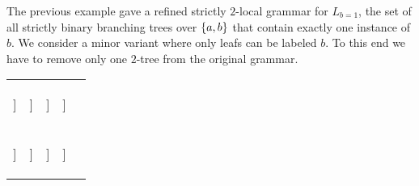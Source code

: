 \begin{examplebox}
    The previous example gave a refined strictly $2$-local grammar for $L_{b=1}$, the set of all strictly binary branching trees over $\left \{ a,b \right \}$ that contain exactly one instance of $b$.
    We consider a minor variant where only leafs can be labeled $b$.
    To this end we have to remove only one $2$-tree from the original grammar.
    \begin{center}
        \begin{tabular}{ccccc}
            \begin{forest}
                [\kState{0}{a}
                    [\kState{0}{\RightEdge}]
                ]
            \end{forest}
            &
            \begin{forest}
                [\kState{1}{b}
                    [\kState{1}{\RightEdge}]
                ]
            \end{forest}
            &
            \begin{forest}
                [\kState{1}{\LeftEdge}
                    [\kState{1}{a}]
                ]
            \end{forest}
            &
            \begin{forest}
                [\kState{1}{\LeftEdge}
                    [\kState{1}{b}]
                ]
            \end{forest}
            \\
            \begin{forest}
                [\kState{0}{a}
                    [\kState{0}{a}]
                    [\kState{0}{a}]
                ]
            \end{forest}
            &
            \begin{forest}
                [\kState{1}{a}
                    [\kState{0}{a}]
                    [\kState{1}{a}]
                ]
            \end{forest}
            &
            \begin{forest}
                [\kState{1}{a}
                    [\kState{1}{a}]
                    [\kState{0}{a}]
                ]
            \end{forest}
            &
            \begin{forest}
                [\kState{1}{a}
                    [\kState{0}{a}]
                    [\kState{1}{b}]
                ]
            \end{forest}

\end{tabular}
\end{center}
\end{examplebox}
